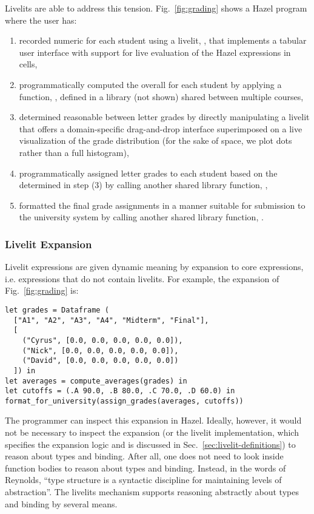 Livelits are able to address this tension. 
Fig.~\ref{fig:grading} shows a Hazel program where the user has:
\begin{enumerate}
\item recorded numeric  for each student using a livelit, , that implements a tabular user interface with support for live evaluation of the Hazel expressions in cells, 
\item programmatically computed the overall  for each student by applying a function, , defined in a library  (not shown) shared between multiple courses, 
\item determined reasonable  between letter grades by directly manipulating a livelit that offers a domain-specific drag-and-drop interface superimposed on a live visualization of the grade distribution 
(for the sake of space, we plot dots rather than a full histogram), 
\item programmatically assigned letter grades to each student based on the  determined in step (3) by calling another shared library function, , 
\item formatted the final grade assignments in a manner suitable for submission to the university system by calling another shared library function, .
\end{enumerate}

\subsubsection{Livelit Expansion} 
Livelit expressions are given dynamic meaning by expansion to core expressions, i.e. expressions that do not contain livelits.
For example, the expansion of Fig.~\ref{fig:grading} is:

\begin{lstlisting}
let grades = Dataframe (
  ["A1", "A2", "A3", "A4", "Midterm", "Final"],
  [
    ("Cyrus", [0.0, 0.0, 0.0, 0.0, 0.0]),
    ("Nick", [0.0, 0.0, 0.0, 0.0, 0.0]),
    ("David", [0.0, 0.0, 0.0, 0.0, 0.0])
  ]) in 
let averages = compute_averages(grades) in 
let cutoffs = (.A 90.0, .B 80.0, .C 70.0, .D 60.0) in 
format_for_university(assign_grades(averages, cutoffs))
\end{lstlisting}

The programmer can inspect this expansion in Hazel. 
Ideally, however, it would not be necessary to inspect the expansion 
(or the livelit implementation, which specifies the expansion logic and is discussed in Sec.~\ref{sec:livelit-definitions}) 
to reason about types and binding. 
After all, one does not need to look inside 
function bodies to reason about types and binding.
Instead, in the words of Reynolds, 
``type structure is a syntactic discipline for maintaining levels of abstraction''.
The livelits mechanism supports reasoning abstractly about types and binding by 
several means.

